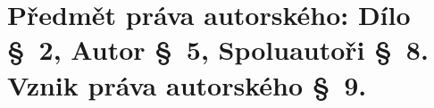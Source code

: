 \section{Předmět práva autorského: Dílo §~2, Autor §~5, Spoluautoři §~8. Vznik práva autorského §~9.}